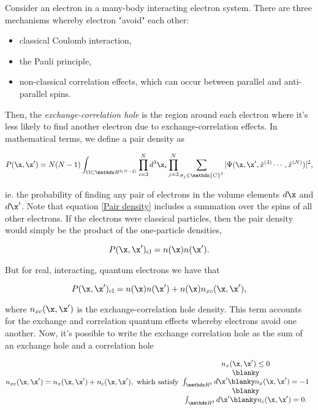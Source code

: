\documentclass{homework}
\begin{document}
Consider an electron in a many-body interacting electron system. There are three mechanisms whereby electron "avoid" each other:

\begin{itemize}
    \item classical Coulomb interaction, 
    \item the Pauli principle, 
    \item non-classical correlation effects, which can occur between parallel and anti-parallel spins. 
\end{itemize}

Then, the \textit{exchange-correlation hole} is the region around each electron where it's less likely to find another electron due to exchange-correlation effects. In mathematical terms, we define a pair density as 

\begin{equation}
    P(\x, \x') = N(N-1) \int_{\Omega \subset \R^{3(N-2)}} \prod_{i=3}^{N} d^{3}\x_i \prod_{j=3}^{N} \sum_{\sigma_j \in \mathds{C}^2} |\Psi(\x, \x', \tilde{x}^{(3)}\cdots, \tilde{x}^{(N)})|^2,
    \label{Pair density}
\end{equation}

ie. the probability of finding any pair of electrons in the volume elements $d\x$ and $d\x'$. Note that equation \eqref{Pair density} includes a summation over the spins of all other electrons. If the electrons were classical particles, then the pair density would simply be the product of the one-particle densities,

$$
P(\x, \x')_{\textnormal{cl}} = n(\x)n(\x').
$$

But for real, interacting, quantum electrons we have that 

$$
P(\x, \x')_{\textnormal{cl}} = n(\x)n(\x') + n(\x) n_{xc}(\x, \x'),
$$

where $n_{xc}(\x, \x')$ is the exchange-correlation hole density. This term accounts for the exchange and correlation quantum effects whereby electrons avoid one another. Now, it's possible to write the exchange correlation hole as the sum of an exchange hole and a correlation hole 

$$
n_{xc}(\x, \x') = n_{x}(\x, \x') + n_{c}(\x, \x'), \textnormal{ which satisfy} \begin{array}{c}
     n_{x}(\x, \x') \leq 0  \\
     \blanky \\
     \int_{\R^{3}} d\x' \blanky n_{x}(\x, \x') = -1\\
     \blanky \\
     \int_{\R^{3}} d\x' \blanky n_{c}(\x, \x') = 0.
\end{array}
$$
\end{document}
